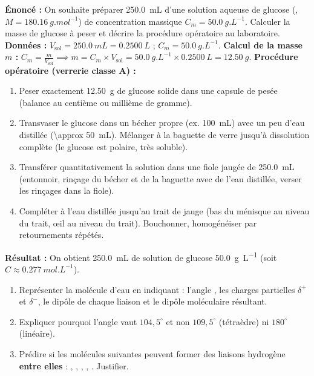 \documentclass[11pt]{article}
\newcounter{popsec}
\newcounter{popsub}
\newcommand{\courssub}[1]{%
  \stepcounter{popsub}%
  \par\vspace{9pt}\noindent{\popxbold\fontsize{11.5}{13}\selectfont\color{popink}{\color{poporange}\thepopsec.\thepopsub}\hspace{6pt}#1}\par\nopagebreak\vspace{4pt}
}
\begin{document}
\begin{exoresolu}
\textbf{Énoncé :} On souhaite préparer \SI{250,0}{mL} d'une solution aqueuse de glucose (, $M = \SI{180,16}{g.mol^{-1}}$) de concentration massique $C_m = \SI{50,0}{g.L^{-1}}$. Calculer la masse de glucose à peser et décrire la procédure opératoire au laboratoire.
\tcblower
\textbf{Données :} $V_{\text{sol}} = \SI{250,0}{mL} = \SI{0,2500}{L}$ ; $C_m = \SI{50,0}{g.L^{-1}}$.
\textbf{Calcul de la masse $m$ :}
$C_m = \frac{m}{V_{\text{sol}}} \implies m = C_m \times V_{\text{sol}} = \SI{50,0}{g.L^{-1}} \times \SI{0,2500}{L} = \SI{12,50}{g}$.
\textbf{Procédure opératoire (verrerie classe A) :}
\begin{enumerate}
    \item Peser exactement \SI{12,50}{g} de glucose solide dans une capsule de pesée (balance au centième ou millième de gramme).
    \item Transvaser le glucose dans un bécher propre (ex. \SI{100}{mL}) avec un peu d'eau distillée (\SI{\approx 50}{mL}). Mélanger à la baguette de verre jusqu'à dissolution complète (le glucose est polaire, très soluble).
    \item Transférer quantitativement la solution dans une fiole jaugée de \SI{250,0}{mL} (entonnoir, rinçage du bécher et de la baguette avec de l'eau distillée, verser les rinçages dans la fiole).
    \item Compléter à l'eau distillée jusqu'au trait de jauge (bas du ménisque au niveau du trait, œil au niveau du trait). Bouchonner, homogénéiser par retournements répétés.
\end{enumerate}
\textbf{Résultat :} On obtient \SI{250,0}{mL} de solution de glucose \SI{50,0}{g.L^{-1}} (soit $C \approx \SI{0,277}{mol.L^{-1}}$).
\end{exoresolu}

\courssub{Exercices d'application}

\begin{exercice}
\begin{enumerate}
    \item Représenter la molécule d'eau  en indiquant : l'angle , les charges partielles $\delta^+$ et $\delta^-$, le dipôle de chaque liaison  et le dipôle moléculaire résultant.
    \item Expliquer pourquoi l'angle  vaut $104,5^\circ$ et non $109,5^\circ$ (tétraèdre) ni $180^\circ$ (linéaire).
    \item Prédire si les molécules suivantes peuvent former des liaisons hydrogène \textbf{entre elles} : , , , , . Justifier.
\end{enumerate}
\end{exercice}
\end{document}
